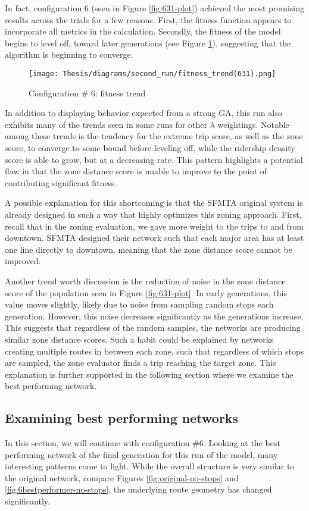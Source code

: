 \documentclass[11pt]{amsart}
\theoremstyle{definition}                  %
\theoremstyle{remark}                       %
\numberwithin{equation}{section}
\begin{document}
In fact, configuration 6 (seen in Figure \ref{fig:631-plot}) achieved the most promising results across the trials for a few reasons. First, the fitness function appears to incorporate all metrics in the calculation. Secondly, the fitness of the model begins to level off, toward later generations (see Figure \ref {fig:631-plot-trend}), suggesting that the algorithm is beginning to converge. 

\begin{figure}[H]
    \centering
    \texttt{[image: Thesis/diagrams/second\_run/fitness\_trend(631).png]}
    \caption{Configuration \# 6: fitness trend}
    \label{fig:631-plot-trend}
\end{figure}

In addition to displaying behavior expected from a strong GA, this run also exhibits many of the trends seen in some runs for other $\lambda$ weightings. Notable among these trends is the tendency for the extreme trip score, as well as the zone score, to converge to some bound before leveling off, while the ridership density score is able to grow, but at a decreasing rate. This pattern highlights a potential flaw in that the zone distance score is unable to improve to the point of contributing significant fitness. 

A possible explanation for this shortcoming is that the SFMTA original system is already designed in such a way that highly optimizes this zoning approach. First, recall that in the zoning evaluation, we gave more weight to the trips to and from downtown. SFMTA designed their network such that each major area has at least one line directly to downtown, meaning that the zone distance score cannot be improved. 

Another trend worth discussion is the reduction of noise in the zone distance score of the population seen in Figure \ref{fig:631-plot}. In early generations, this value moves slightly, likely due to noise from sampling random stops each generation. However, this noise decreases significantly as the generations increase. This suggests that regardless of the random samples, the networks are producing similar zone distance scores. Such a habit could be explained by networks creating multiple routes in between each zone, such that regardless of which stops are sampled, the zone evaluator finds a trip reaching the target zone. This explanation is further supported in the following section where we examine the best performing network. 

\subsection{Examining best performing networks}
In this section, we will continue with configuration \#6. Looking at the best performing network of the final generation for this run of the model, many interesting patterns come to light. While the overall structure is very similar to the original network, compare Figures \ref{fig:original-no-stops} and \ref{fig:6bestperformer-no-stops}, the underlying route geometry has changed significantly. 
\end{document}
